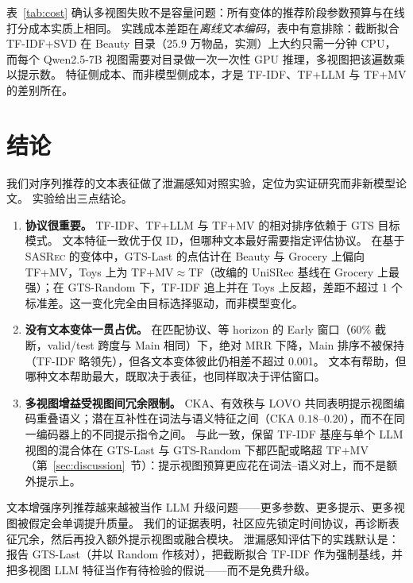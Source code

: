 \documentclass[sigconf,natbib=true,anonymous]{acmart}
\newcommand{\tfidf}{\textsc{TF-IDF}\xspace}
\newcommand{\tfllm}{\textsc{TF+LLM}\xspace}
\newcommand{\tfmv}{\textsc{TF+MV}\xspace}
\newcommand{\base}{\textsc{SASRec}\xspace}
\begin{document}
表~\ref{tab:cost} 确认多视图失败不是容量问题：所有变体的推荐阶段参数预算与在线打分成本实质上相同。
实践成本差距在\emph{离线文本编码}，表中有意排除：截断拟合 \tfidf+SVD 在 Beauty 目录（25.9 万物品，实测）上大约只需一分钟 CPU，而每个 Qwen2.5-7B 视图需要对目录做一次一次性 GPU 推理，多视图把该遍数乘以提示数。
特征侧成本、而非模型侧成本，才是 \tfidf、\tfllm 与 \tfmv 的差别所在。

\section{结论}
\label{sec:conclusion}

我们对序列推荐的文本表征做了泄漏感知对照实验，定位为实证研究而非新模型论文。
实验给出三点结论。

\begin{enumerate}[leftmargin=*,itemsep=1pt]
\item \textbf{协议很重要。}
\tfidf、\tfllm 与 \tfmv 的相对排序依赖于 GTS 目标模式。
文本特征一致优于仅 ID，但哪种文本最好需要指定评估协议。
在基于 \base 的变体中，GTS-Last 的点估计在 Beauty 与 Grocery 上偏向 \tfmv，Toys 上为 TF+MV${}\approx{}$TF（改编的 UniSRec 基线在 Grocery 上最强）；在 GTS-Random 下，\tfidf 追上并在 Toys 上反超，差距不超过 1 个标准差。这一变化完全由目标选择驱动，而非模型变化。
\item \textbf{没有文本变体一贯占优。}
在匹配协议、等 horizon 的 Early 窗口（$60\%$ 截断，valid/test 跨度与 Main 相同）下，绝对 MRR 下降，Main 排序不被保持（\tfidf 略领先），但各文本变体彼此仍相差不超过 0.001。
文本有帮助，但哪种文本帮助最大，既取决于表征，也同样取决于评估窗口。
\item \textbf{多视图增益受视图间冗余限制。}
CKA、有效秩与 LOVO 共同表明提示视图编码重叠语义；潜在互补性在词法与语义特征之间（CKA $0.18$--$0.20$），而不在同一编码器上的不同提示指令之间。
与此一致，保留 \tfidf 基座与单个 LLM 视图的混合体在 GTS-Last 与 GTS-Random 下都匹配或略超 \tfmv（第~\ref{sec:discussion}~节）：提示视图预算更应花在词法--语义对上，而不是额外提示上。
\end{enumerate}

文本增强序列推荐越来越被当作 LLM 升级问题——更多参数、更多提示、更多视图被假定会单调提升质量。
我们的证据表明，社区应先锁定时间协议，再诊断表征冗余，然后再投入额外提示视图或融合模块。
泄漏感知评估下的实践默认是：报告 GTS-Last（并以 Random 作核对），把截断拟合 \tfidf 作为强制基线，并把多视图 LLM 特征当作有待检验的假说——而不是免费升级。
\end{document}
